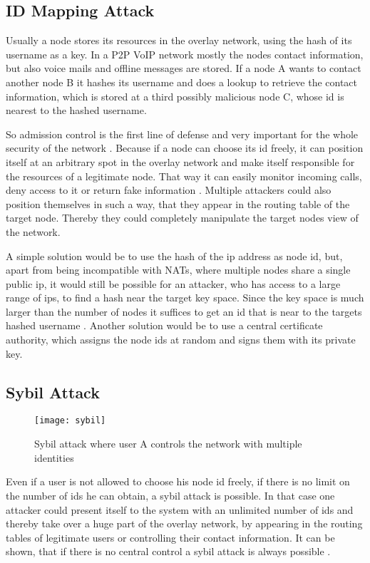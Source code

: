 \documentclass[a4paper,conference]{IEEEtran}
\begin{document}
\subsection{ID Mapping Attack}
\label{idmap}
Usually a node stores its resources in the overlay network, using the hash of
its username as a key. In a P2P VoIP network mostly the nodes contact
information, but
 also voice mails and offline messages are stored. If a node A wants to contact
another node B it hashes its username and does a lookup to retrieve the
contact information, which is stored at a third possibly malicious node C, whose
id is nearest to the hashed username.

So admission control is the first line of defense and very important for the
whole security of the network \cite{touceda, chopra}.
Because if a node can choose its id freely, it can position itself at an
arbitrary spot in the overlay network and make itself responsible for the
resources of a legitimate node. That way it can easily monitor incoming calls,
deny access to it or return fake information \cite{touceda}. Multiple attackers
could also position themselves in such a way, that they appear in the routing
table of the target node. Thereby they could completely manipulate the target
nodes view
of the network.

A simple solution would be to use the hash of the ip address as node id, but,
apart from being incompatible with NATs, where multiple nodes share a single
public ip,
it would still be possible for an attacker, who has access to a large range of
ips, to find a hash near the target key space. Since the key space
is much larger than the number of nodes it suffices to get an id that is near to
the targets hashed username \cite{touceda}.
Another solution would be to use a central certificate authority, which assigns
the node ids at random and signs them with its private key.


\subsection{Sybil Attack}
\label{sybil}
\begin{figure}
\centering
\texttt{[image: sybil]}

\caption{Sybil attack where user A controls the network with multiple identities
\cite{touceda}}
\label{fig:sybil}
\end{figure}
Even if a user is not allowed to choose his node id freely, if there is no limit
on the number of ids he can obtain, a sybil attack is possible.
In that case one attacker could present itself to the system with an unlimited
number of ids and thereby take over a huge part of the overlay network, by
appearing in the routing tables of legitimate users or controlling their contact
information.
It can be shown, that if there is no central control a sybil attack is always
possible \cite{douceur, touceda}.
\end{document}
